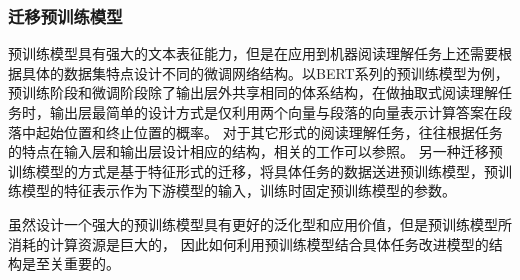 \subsubsection{迁移预训练模型}
预训练模型具有强大的文本表征能力，但是在应用到机器阅读理解任务上还需要根据具体的数据集特点设计不同的微调网络结构。以BERT系列的预训练模型为例，预训练阶段和微调阶段除了输出层外共享相同的体系结构，在做抽取式阅读理解任务时，输出层最简单的设计方式是仅利用两个向量与段落的向量表示计算答案在段落中起始位置和终止位置的概率。
对于其它形式的阅读理解任务，往往根据任务的特点在输入层和输出层设计相应的结构，相关的工作可以参照。
另一种迁移预训练模型的方式是基于特征形式的迁移，将具体任务的数据送进预训练模型，预训练模型的特征表示作为下游模型的输入，训练时固定预训练模型的参数。


%



虽然设计一个强大的预训练模型具有更好的泛化型和应用价值，但是预训练模型所消耗的计算资源是巨大的，
因此如何利用预训练模型结合具体任务改进模型的结构是至关重要的。

